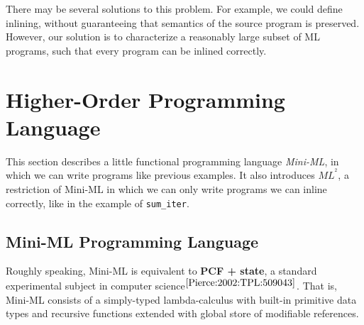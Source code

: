 \documentclass[a4paper,11pt,oneside]{article}
\theoremstyle{plain}
\newcommand{\inlsrc}{\textit{ML}^{^2}}
\begin{document}
There may be several solutions to this problem. For example, we could define inlining, without guaranteeing that semantics of the source program is preserved. 
However, our solution is to characterize a reasonably large subset of ML programs, such that every program can be inlined correctly. 

\newpage
\section{Higher-Order Programming Language }

	This section describes a little functional programming language \textit{Mini-ML}, in which we can write programs like previous examples. 
	It also introduces ${\inlsrc}$, a restriction of Mini-ML in which we can only write programs we can inline correctly, like in the example of \texttt{sum\_iter}. 
	
\subsection{Mini-ML Programming Language}

	Roughly speaking, Mini-ML is equivalent to \textbf{PCF + state}, a standard experimental subject in computer science{\footnotesize$^{ \cite[p.~143]{Pierce:2002:TPL:509043}}$}. 
	That is, Mini-ML consists of a simply-typed lambda-calculus with built-in primitive data types and recursive functions extended with global store of modifiable references.
	
\end{document}
